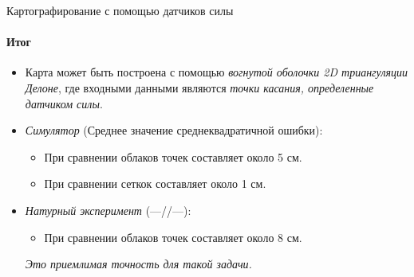 \documentclass[aspectratio=169,xcolor=table]{beamer}
\begin{document}
\begin{frame}[t]{Картографирование с помощью датчиков силы}
    \framesubtitle{Итог}
    \large
    \begin{itemize}
        \item Карта может быть построена с помощью \textit{вогнутой оболочки 2D триангуляции Делоне}, где входными данными являются \textit{точки касания, определенные датчиком силы}.
        \item \textit{Симулятор} (Среднее значение среднеквадратичной ошибки): \begin{itemize}
            \large
                  \item При сравнении облаков точек составляет около 5 см.
                  \item При сравнении сеткок составляет около 1 см.
              \end{itemize}
        \item \textit{Натурный эксперимент} (---//---): \begin{itemize}
            \large
                  \item При сравнении облаков точек составляет около 8 см.
              \end{itemize}
              \textit{Это приемлимая точность для такой задачи.}
    \end{itemize}
\end{frame}
\end{document}
